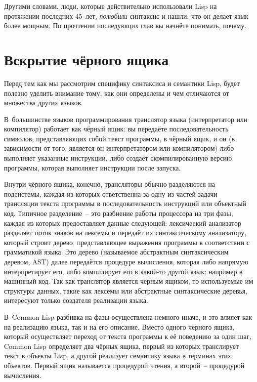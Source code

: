 Другими словами, люди, которые действительно использовали Lisp на протяжении последних
45~лет, \textit{полюбили} синтаксис и нашли, что он делает язык более мощным. По прочтении
последующих глав вы начнёте понимать, почему.

\section{Вскрытие чёрного ящика}

Перед тем как мы рассмотрим специфику синтаксиса и семантики Lisp, будет полезно уделить
внимание тому, как они определены и чем отличаются от множества других языков.

В~большинстве языков программирования транслятор языка (интерпретатор или компилятор)
работает как чёрный ящик: вы передаёте последовательность символов, представляющих собой
текст программы, в чёрный ящик, и он (в зависимости от того, является он интерпретатором
или компилятором) либо выполняет указанные инструкции, либо создаёт скомпилированную
версию программы, которая выполняет инструкции после запуска.

Внутри чёрного ящика, конечно, трансляторы обычно разделяются на подсистемы, каждая из
которых ответственна за одну из частей задачи трансляции текста программы в
последовательность инструкций или объектный код. Типичное разделение~-- это разбиение
работы процессора на три фазы, каждая из которых предоставляет данные следующей:
лексический анализатор разделяет поток знаков на лексемы и передаёт их синтаксическому
анализатору, который строит дерево, представляющее выражения программы в соответствии с
грамматикой языка. Это дерево (называемое абстрактным синтаксическим деревом, AST) далее
передаётся процедуре вычисления, которая либо напрямую интерпретирует его, либо
компилирует его в какой-то другой язык; например в машинный код. Так как транслятор
является чёрным ящиком, то используемые им структуры данных, такие как лексемы или
абстрактные синтаксические деревья, интересуют только создателя реализации языка.

В~Common Lisp разбивка на фазы осуществлена немного иначе, и это влияет как на реализацию
языка, так и на его описание. Вместо одного чёрного ящика, который осуществляет переход от
текста программы к её поведению за один шаг, Common Lisp определяет два чёрных ящика,
первый из которых транслирует текст в объекты Lisp, а другой реализует семантику языка в
терминах этих объектов. Первый ящик называется процедурой чтения, а второй~-- процедурой
вычисления.

